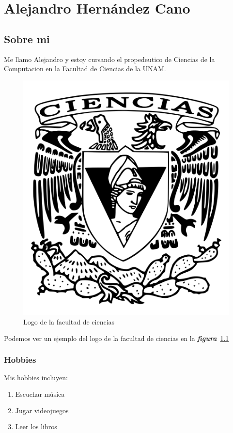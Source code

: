 \chapter{Alejandro Hernández Cano}

\section{Sobre mi}
Me llamo Alejandro y estoy cursando el propedeutico de Ciencias de la
Computacion en la Facultad de Ciencias de la UNAM.

\begin{figure}[h]
  \centering
  \includegraphics[scale=0.25]{3.png}
  \caption{Logo de la facultad de ciencias}
  \label{fig:fciencias}
\end{figure}

Podemos ver un ejemplo del logo de la facultad de ciencias en la
\emph{\textbf{figura}}~\ref{fig:fciencias}

\subsection{Hobbies}
Mis hobbies incluyen:
\begin{enumerate}
\item Escuchar música
\item Jugar videojuegos
\item Leer los libros ~\cite{torres, comunidad, retorno}
\end{enumerate}

